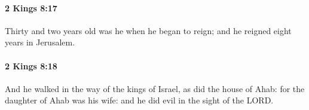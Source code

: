 		\paragraph{2 Kings 8:17} %
			\label{2KINGS-8-17}

			Thirty and two years old was he when he began to reign; and he reigned eight years in Jerusalem.


		\paragraph{2 Kings 8:18} %
			\label{2KINGS-8-18}

			And he walked in the way of the kings of Israel, as did the house of Ahab: for the daughter of Ahab was his wife: and he did evil in the sight of the LORD.


